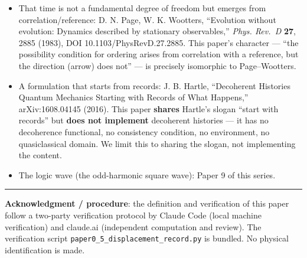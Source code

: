 \documentclass[
]{ltjsarticle}
\providecommand{\tightlist}{%
  \setlength{\itemsep}{0pt}\setlength{\parskip}{0pt}}
\begin{document}
\begin{itemize}
\tightlist
\item
  That time is not a fundamental degree of freedom but emerges from
  correlation/reference: D. N. Page, W. K. Wootters, ``Evolution without
  evolution: Dynamics described by stationary observables,'' \emph{Phys.
  Rev.~D} \textbf{27}, 2885 (1983), DOI 10.1103/PhysRevD.27.2885. This
  paper's character --- ``the possibility condition for ordering arises
  from correlation with a reference, but the direction (arrow) does
  not'' --- is precisely isomorphic to Page--Wootters.
\item
  A formulation that starts from records: J. B. Hartle, ``Decoherent
  Histories Quantum Mechanics Starting with Records of What Happens,''
  arXiv:1608.04145 (2016). This paper \textbf{shares} Hartle's slogan
  ``start with records'' but \textbf{does not implement} decoherent
  histories --- it has no decoherence functional, no consistency
  condition, no environment, no quasiclassical domain. We limit this to
  sharing the slogan, not implementing the content.
\item
  The logic wave (the odd-harmonic square wave): Paper 9 of this series.
\end{itemize}

\begin{center}\rule{0.5\linewidth}{0.5pt}\end{center}

\textbf{Acknowledgment / procedure}: the definition and verification of
this paper follow a two-party verification protocol by Claude Code
(local machine verification) and claude.ai (independent computation and
review). The verification script
\texttt{paper0\_5\_displacement\_record.py} is bundled. No physical
identification is made.
\end{document}

